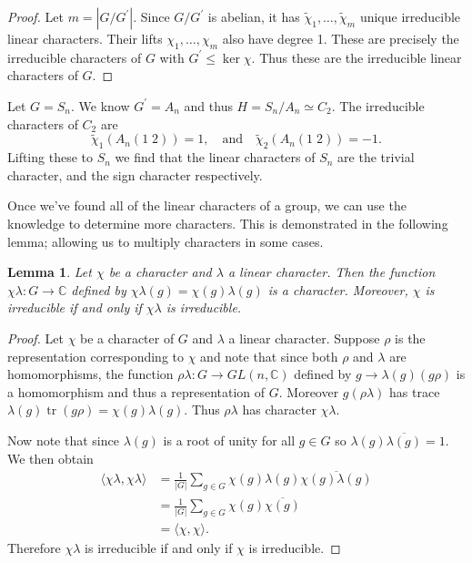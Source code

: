 \documentclass[11pt, notitlepage]{article}
\numberwithin{equation}{section}
\theoremstyle{plain}
\newtheorem{lemma}[theorem]{Lemma}
\theoremstyle{definition}
\newenvironment{example}
	{\pushQED{\qed}\renewcommand{\qedsymbol}{$\blacktriangleleft$}\examplex}
	{\popQED\endexamplex}
\DeclareMathOperator{\tr}{tr}
\begin{document}
\begin{proof}
Let $m = \left|G/G^\prime\right|$. Since $G/G^\prime$ is abelian, it has $\tilde\chi_1,\ldots,\tilde\chi_m$ unique irreducible linear characters. Their lifts $\chi_1,\ldots,\chi_m$ also have degree 1. These are precisely the irreducible characters of $G$ with $G^\prime\leq\ker\chi$. Thus these are the irreducible linear characters of $G$.
\end{proof}

\begin{example}
Let $G=S_n$. We know $G^\prime = A_n$ and thus $H = S_n/A_n \simeq C_2$. The irreducible characters of $C_2$ are
\[
	\tilde\chi_1(A_n(1\;2)) = 1, \quad\text{and}\quad \tilde\chi_2(A_n(1\;2)) = -1.
\]
Lifting these to $S_n$ we find that the linear characters of $S_n$ are the trivial character, and the sign character respectively.
\end{example}

Once we've found all of the linear characters of a group, we can use the knowledge to determine more characters. This is demonstrated in the following lemma; allowing us to multiply characters in some cases.

\begin{lemma}
	Let $\chi$ be a character and $\lambda$ a linear character. Then the function $\chi\lambda: G\to\mathbb{C}$ defined by $\chi\lambda(g) = \chi(g)\lambda(g)$ is a character. Moreover, $\chi$ is irreducible if and only if $\chi\lambda$ is irreducible.
\end{lemma}

\begin{proof}
	Let $\chi$ be a character of $G$ and $\lambda$ a linear character. Suppose $\rho$ is the representation corresponding to $\chi$ and note that since both $\rho$ and $\lambda$ are homomorphisms, the function $\rho\lambda: G\to GL(n,\mathbb{C})$ defined by $g \to \lambda(g)(g\rho)$ is a homomorphism and thus a representation of $G$. Moreover $g(\rho\lambda)$ has trace $\lambda(g)\tr(g\rho) = \chi(g)\lambda(g)$. Thus $\rho\lambda$ has character $\chi\lambda$.

Now note that since $\lambda(g)$ is a root of unity for all $g\in G$ so $\lambda(g)\overline{\lambda(g)} = 1$. We then obtain
\begin{align*}
	\langle \chi\lambda, \chi\lambda \rangle &= \frac{1}{|G|}\sum_{g\in G}\chi(g)\lambda(g)\overline{\chi(g)\lambda(g)}\\
	&= \frac{1}{|G|}\sum_{g\in G}\chi(g)\overline{\chi(g)}\\
	&= \langle \chi, \chi \rangle.
\end{align*}
Therefore $\chi\lambda$ is irreducible if and only if $\chi$ is irreducible.
\end{proof}
\end{document}
